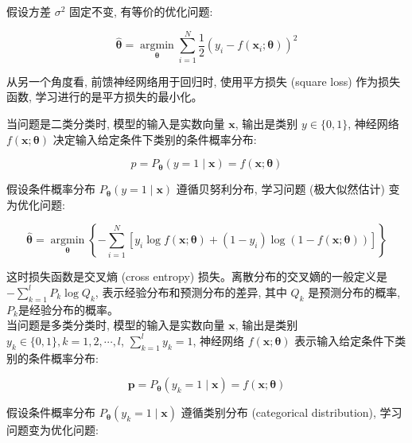 \documentclass[10pt]{article}
\begin{document}
\begin{CJK*}{UTF8}{bsmi}
假设方差 $\sigma^{2}$ 固定不变, 有等价的优化问题:


\begin{equation*}
\hat{\boldsymbol{\theta}}=\underset{\boldsymbol{\theta}}{\operatorname{argmin}} \sum_{i=1}^{N} \frac{1}{2}\left(y_{i}-f\left(\boldsymbol{x}_{i} ; \boldsymbol{\theta}\right)\right)^{2} \tag{23.32}
\end{equation*}


从另一个角度看, 前馈神经网络用于回归时, 使用平方损失 (square loss) 作为损失函数, 学习进行的是平方损失的最小化。

当问题是二类分类时, 模型的输入是实数向量 $\boldsymbol{x}$, 输出是类别 $y \in\{0,1\}$, 神经网络 $f(\boldsymbol{x} ; \boldsymbol{\theta})$ 决定输入给定条件下类别的条件概率分布:


\begin{equation*}
p=P_{\boldsymbol{\theta}}(y=1 \mid \boldsymbol{x})=f(\boldsymbol{x} ; \boldsymbol{\theta}) \tag{23.33}
\end{equation*}


假设条件概率分布 $P_{\boldsymbol{\theta}}(y=1 \mid \boldsymbol{x})$ 遵循贝努利分布, 学习问题 (极大似然估计) 变为优化问题:


\begin{equation*}
\hat{\boldsymbol{\theta}}=\underset{\boldsymbol{\theta}}{\operatorname{argmin}}\left\{-\sum_{i=1}^{N}\left[y_{i} \log f(\boldsymbol{x} ; \boldsymbol{\theta})+\left(1-y_{i}\right) \log (1-f(\boldsymbol{x} ; \boldsymbol{\theta}))\right]\right\} \tag{23.34}
\end{equation*}


这时损失函数是交叉熵 (cross entropy) 损失。离散分布的交叉嫡的一般定义是 $-\sum_{k=1}^{l} P_{k} \log Q_{k}$, 表示经验分布和预测分布的差异, 其中 $Q_{k}$ 是预测分布的概率, $P_{k}$是经验分布的概率。\\
当问题是多类分类时, 模型的输入是实数向量 $\boldsymbol{x}$, 输出是类别 $y_{k} \in\{0,1\}, k=1,2, \cdots, l$, $\sum_{k=1}^{l} y_{k}=1$, 神经网络 $f(\boldsymbol{x} ; \boldsymbol{\theta})$ 表示输入给定条件下类别的条件概率分布:


\begin{equation*}
\boldsymbol{p}=P_{\boldsymbol{\theta}}\left(y_{k}=1 \mid \boldsymbol{x}\right)=f(\boldsymbol{x} ; \boldsymbol{\theta}) \tag{23.35}
\end{equation*}


假设条件概率分布 $P_{\boldsymbol{\theta}}\left(y_{k}=1 \mid \boldsymbol{x}\right)$ 遵循类别分布 (categorical distribution), 学习问题变为优化问题:



\end{CJK*}
\end{document}
